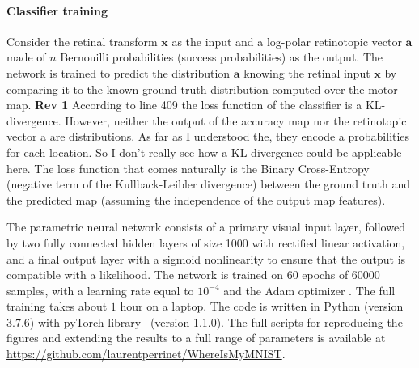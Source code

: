 
\paragraph{Classifier training}

Consider the retinal transform $\boldsymbol{x}$ as the input and a log-polar retinotopic vector $\boldsymbol{a}$ made of $n$ Bernouilli probabilities (success probabilities) as the output. %
The network is trained to predict the distribution $\boldsymbol{a}$ knowing the retinal input $\boldsymbol{x}$ by comparing it to the known ground truth distribution computed over the motor map.
{\color{magenta} \textbf{Rev 1} According to line 409 the loss function of the classifier is a KL-divergence. However, neither the output of the accuracy map nor the retinotopic vector a are distributions. As far as I understood the, they encode a probabilities for each location. So I don't really see how a KL-divergence could be applicable here.}
The loss function that comes naturally is the Binary Cross-Entropy (negative term of the Kullback-Leibler divergence) between the ground truth and the predicted map (assuming the independence of the output map features).


The parametric neural network consists of a primary visual input layer, followed by two fully connected hidden layers of size 1000  with rectified linear activation,
and a final output layer with a sigmoid nonlinearity to ensure that the output is compatible with a likelihood.
The network is trained on 60 epochs of 60000 samples, with a learning rate equal to $10^{-4}$ and the Adam optimizer \cite{kingma2014adam}.
The full training takes about $1$ hour on a laptop. The code is written in Python (version 3.7.6) with pyTorch library~\cite{NEURIPS2019_9015} (version 1.1.0). The full scripts for reproducing the figures and extending the results to a full range of parameters is available at \url{https://github.com/laurentperrinet/WhereIsMyMNIST}. %
